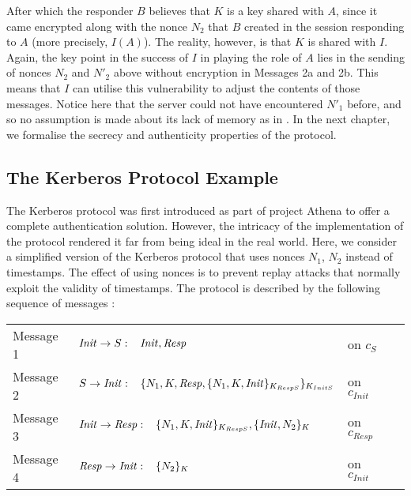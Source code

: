 \documentclass[10pt,a4paper,final,oneside,fleqn]{book}
\begin{document}
\noindent
After which the responder $B$ believes that $K$ is a key shared with $A$, since it came encrypted along with the nonce $N_2$ that $B$ created in the session responding to $A$ (more precisely, $I(A)$).  The reality, however, is that $K$ is shared with $I$.  Again, the key point in the success of $I$ in playing the role of $A$ lies in the sending of nonces $N_2$ and $N'_2$ above without encryption in Messages 2a and 2b.  This means that $I$ can utilise this vulnerability to adjust the contents of those messages.  Notice here that the server could not have encountered $N'_1$ before, and so no assumption is made about its lack of memory as in \cite{boyd1}.  In the next chapter, we formalise the secrecy and authenticity properties of the protocol.
\subsection{The Kerberos Protocol Example \label{sect:ankerberos}}
The Kerberos protocol was first introduced as part of project Athena \cite{miller1} to offer a complete authentication solution.  However, the intricacy of the implementation of the protocol rendered it far from being ideal in the real world.  Here, we consider a simplified version of the Kerberos protocol that uses nonces $N_1$, $N_2$ instead of timestamps.  The effect of using nonces is to prevent replay attacks that normally exploit the validity of timestamps.  The protocol is described by the following sequence of messages \cite{boreale2}:\vspace{5mm}

\begin{tabular}{llll} Message 1&\hspace{3mm}$\mbox{{\itshape Init\/}}\to S:\hspace{3mm}\mbox{{\itshape Init\/}},\mbox{{\itshape Resp\/}}$&on $c_{S}$\\
Message 2&\hspace{3mm}$S\to\mbox{{\itshape Init\/}}:\hspace{3mm}\{N_1\mbox{{\itshape \/}},K,\mbox{{\itshape Resp\/}},\{N_1,K,\mbox{{\itshape Init\/}}\}_{K_{RespS}}\}_{K_{InitS}}$&on $c_{Init}$\\
Message 3&\hspace{3mm}$\mbox{{\itshape Init\/}}\to\mbox{{\itshape Resp\/}}:\hspace{3mm}\{N_1,K,\mbox{{\itshape Init\/}}\}_{K_{RespS}},\{\mbox{{\itshape Init\/}},N_2\}_{K}$&on $c_{Resp}$\\
Message 4&\hspace{3mm}$\mbox{{\itshape Resp\/}}\to\mbox{{\itshape Init\/}}:\hspace{3mm}\{N_2\}_{K}$&on $c_{Init}$
\end{tabular}\vspace{5mm}
\end{document}
